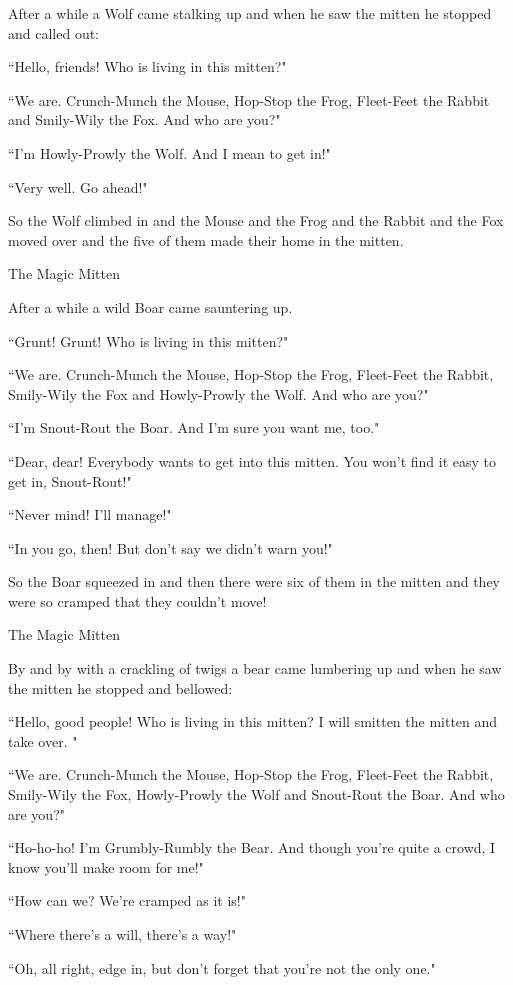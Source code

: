 \documentclass{article}
\begin{document}
After a while a Wolf came stalking up and when he saw the mitten he stopped and called out:

``Hello, friends! Who is living in this mitten?"

``We are. Crunch-Munch the Mouse, Hop-Stop the Frog, Fleet-Feet the Rabbit and Smily-Wily the Fox. And who are you?"

``I'm Howly-Prowly the Wolf. And I mean to get in!"

``Very well. Go ahead!"

So the Wolf climbed in and the Mouse and the Frog and the Rabbit and the Fox moved over and the five of them made their home in the mitten.

The Magic Mitten

After a while a wild Boar came sauntering up.

``Grunt! Grunt! Who is living in this mitten?"

``We are. Crunch-Munch the Mouse, Hop-Stop the Frog, Fleet-Feet the Rabbit, Smily-Wily the Fox and Howly-Prowly the Wolf. And who are you?"

``I'm Snout-Rout the Boar. And I'm sure you want me, too."

``Dear, dear! Everybody wants to get into this mitten. You won't find it easy to get in, Snout-Rout!"

``Never mind! I'll manage!"

``In you go, then! But don't say we didn't warn you!"

So the Boar squeezed in and then there were six of them in the mitten and they were so cramped that they couldn't move!

The Magic Mitten

By and by with a crackling of twigs a bear came lumbering up and when he saw the mitten he stopped and bellowed:

``Hello, good people! Who is living in this mitten? I will smitten the mitten and take over. "

``We are. Crunch-Munch the Mouse, Hop-Stop the Frog, Fleet-Feet the Rabbit, Smily-Wily the Fox, Howly-Prowly the Wolf and Snout-Rout the Boar. And who are you?"

``Ho-ho-ho! I'm Grumbly-Rumbly the Bear. And though you're quite a crowd, I know you'll make room for me!"

``How can we? We're cramped as it is!"

``Where there's a will, there's a way!"

``Oh, all right, edge in, but don't forget that you're not the only one."
\end{document}
